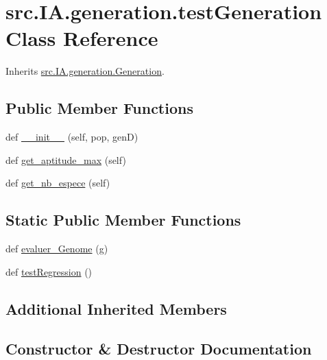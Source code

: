 \hypertarget{classsrc_1_1_i_a_1_1generation_1_1test_generation}{}\section{src.\+I\+A.\+generation.\+test\+Generation Class Reference}
\label{classsrc_1_1_i_a_1_1generation_1_1test_generation}


Inherits \hyperlink{classsrc_1_1_i_a_1_1generation_1_1_generation}{src.\+I\+A.\+generation.\+Generation}.

\subsection*{Public Member Functions}
\begin{DoxyCompactItemize}
\item 
def \hyperlink{classsrc_1_1_i_a_1_1generation_1_1test_generation_a886f36c7251317ff733040ef15783c09}{\+\_\+\+\_\+init\+\_\+\+\_\+} (self, pop, genD)
\item 
def \hyperlink{classsrc_1_1_i_a_1_1generation_1_1test_generation_ab43b6a866dfd6cd202e989fd51bdafa2}{get\+\_\+aptitude\+\_\+max} (self)
\item 
def \hyperlink{classsrc_1_1_i_a_1_1generation_1_1test_generation_a6fcc0ad0daaeef00a258f5fff0755554}{get\+\_\+nb\+\_\+espece} (self)
\end{DoxyCompactItemize}
\subsection*{Static Public Member Functions}
\begin{DoxyCompactItemize}
\item 
def \hyperlink{classsrc_1_1_i_a_1_1generation_1_1test_generation_a4c001eead412c41fc4fdc0c2cbad1220}{evaluer\+\_\+\+Genome} (g)
\item 
def \hyperlink{classsrc_1_1_i_a_1_1generation_1_1test_generation_a9d4eb9830ddca3ca84ce34b55f88a162}{test\+Regression} ()
\end{DoxyCompactItemize}
\subsection*{Additional Inherited Members}


\subsection{Constructor \& Destructor Documentation}
\mbox{\label{classsrc_1_1_i_a_1_1generation_1_1test_generation_a886f36c7251317ff733040ef15783c09}} 
